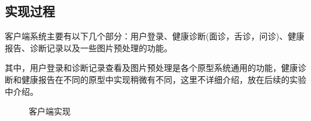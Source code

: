 \subsection{实现过程}

客户端系统主要有以下几个部分：用户登录、健康诊断(面诊，舌诊，问诊)、健康报告、诊断记录以及一些图片预处理的功能。

其中，用户登录和诊断记录查看及图片预处理是各个原型系统通用的功能，健康诊断和健康报告在不同的原型中实现稍微有不同，这里不详细介绍，放在后续的实验中介绍。


\begin{figure}[h]
    \centering
    \caption{客户端实现}
    \label{fig:client}
\end{figure}

